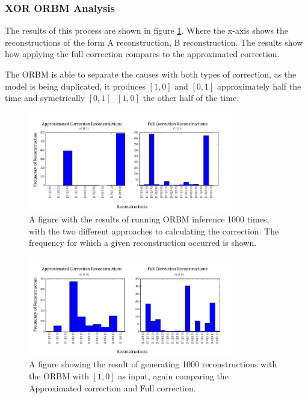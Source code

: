 \subsubsection{XOR ORBM Analysis}

The results of this process are shown in figure \ref{F:Two-Bit-ORBM-Inference-Results-1}. Where the x-axis shows the reconstructions of the form A reconstruction, B reconstruction. The results show how applying the full correction compares to the approximated correction.

The ORBM is able to separate the causes with both types of correction, as the model is being duplicated, it produces $[1,0]$ and $[0,1]$ approximately half the time and symetrically $[0,1]\text{ }[1,0]$ the other half of the time.

\begin{figure}[h]
  \begin{center}
    \includegraphics[width=0.8\textwidth]{Assets/Two-Bit-XOR-Results-Approx-Full.png}
  \end{center}
  \caption{A figure with the results of running ORBM inference 1000 times, with the two different approaches to calculating the correction. The frequency for which a given reconstruction occurred is shown. }
  \label{F:Two-Bit-ORBM-Inference-Results-1}
\end{figure}
\begin{figure}[h]
  \begin{center}
    \includegraphics[width=0.8\textwidth]{Assets/Two-Bit-XOR-Results-Approx-Full-2.png}
  \end{center}
  \caption{A figure showing the result of generating 1000 reconstructions with the ORBM with $[1,0]$ as input, again comparing the Approximated correction and Full correction.}
  \label{F:Two-Bit-RBM-Inference-Results-2}
\end{figure}

